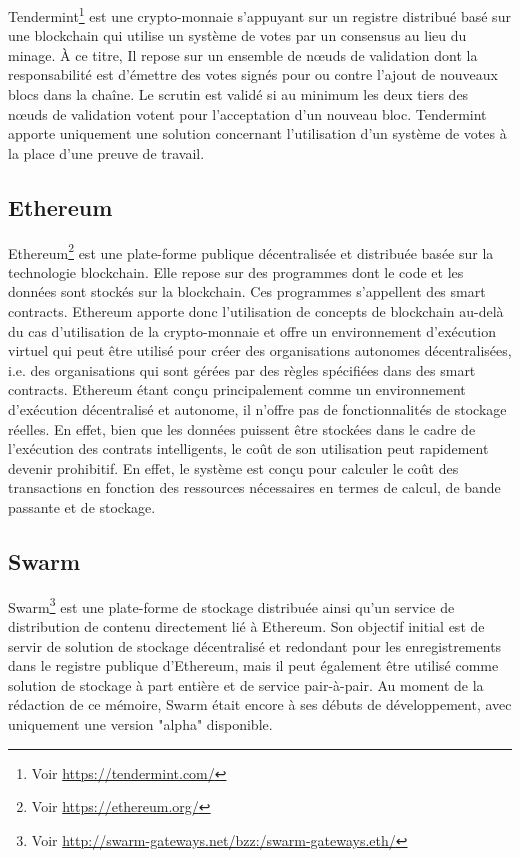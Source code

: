 \documentclass{tnreport}
\begin{document}
Tendermint\footnote{Voir \url{https://tendermint.com/}} est une crypto-monnaie s'appuyant sur un registre distribué basé sur une blockchain qui utilise un système de votes par un consensus au lieu du minage. À ce titre, Il repose sur un ensemble de nœuds de validation dont la responsabilité est d'émettre des votes signés pour ou contre l'ajout de nouveaux blocs dans la chaîne. Le scrutin est validé si au minimum les deux tiers des nœuds de validation votent pour l'acceptation d'un nouveau bloc. Tendermint apporte uniquement une solution concernant l'utilisation d'un système de votes à la place d'une preuve de travail.

\subsection{Ethereum}
\label{sec:ethereum}

Ethereum\footnote{Voir \url{https://ethereum.org/}} est une plate-forme publique décentralisée et distribuée basée sur la technologie blockchain. Elle repose sur des programmes dont le code et les données sont stockés sur la blockchain. Ces programmes s'appellent des smart contracts. 
Ethereum apporte donc l'utilisation de concepts de blockchain au-delà du cas d'utilisation de la crypto-monnaie et offre un environnement d'exécution virtuel qui peut être utilisé pour créer des organisations autonomes décentralisées, i.e. des organisations qui sont gérées par des règles spécifiées dans des smart contracts. Ethereum étant conçu principalement comme un environnement d'exécution décentralisé et autonome, il n'offre pas de fonctionnalités de stockage réelles. En effet, bien que les données puissent être stockées dans le cadre de l'exécution des contrats intelligents, le coût de son utilisation peut rapidement devenir prohibitif. En effet, le système est conçu pour calculer le coût des transactions en fonction des ressources nécessaires en termes de calcul, de bande passante et de stockage.

\subsection{Swarm}

Swarm\footnote{Voir \url{http://swarm-gateways.net/bzz:/swarm-gateways.eth/}} est une plate-forme de stockage distribuée ainsi qu'un service de distribution de contenu directement lié à Ethereum. Son objectif initial est de servir de solution de stockage décentralisé et redondant pour les enregistrements dans le registre publique d'Ethereum, mais il peut également être utilisé comme solution de stockage à part entière et de service pair-à-pair. Au moment de la rédaction de ce mémoire, Swarm était encore à ses débuts de développement, avec uniquement une version "alpha" disponible.
\end{document}
